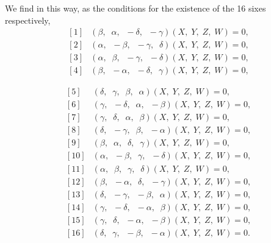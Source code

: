 \documentclass[11pt,a4paper]{article}
\begin{document}
\medskip

We find in this way, as the conditions for the existence of the 16 sixes respectively,
\[
\begin{array}{rl}
{[1]} & (\beta,\;\;\alpha,\;\;-\delta,\;\;-\gamma)(X,\;Y,\;Z,\;W) = 0,\\
{[2]} & (\alpha,\;\;-\beta,\;\;-\gamma,\;\;\delta)(X,\;Y,\;Z,\;W) = 0,\\
{[3]} & (\alpha,\;\;\beta,\;\;-\gamma,\;\;-\delta)(X,\;Y,\;Z,\;W) = 0,\\
{[4]} & (\beta,\;\;-\alpha,\;\;-\delta,\;\;\gamma)(X,\;Y,\;Z,\;W) = 0,
\end{array}
\]

\newpage


\[
\begin{array}{rl}
{[5]} & (\delta,\;\;\gamma,\;\;\beta,\;\;\alpha)(X,\;Y,\;Z,\;W) = 0,\\
{[6]} & (\gamma,\;\;-\delta,\;\;\alpha,\;\;-\beta)(X,\;Y,\;Z,\;W) = 0,\\
{[7]} & (\gamma,\;\;\delta,\;\;\alpha,\;\;\beta)(X,\;Y,\;Z,\;W) = 0,\\
{[8]} & (\delta,\;\;-\gamma,\;\;\beta,\;\;-\alpha)(X,\;Y,\;Z,\;W) = 0,\\
{[9]} & (\beta,\;\;\alpha,\;\;\delta,\;\;\gamma)(X,\;Y,\;Z,\;W) = 0,\\
{[10]} & (\alpha,\;\;-\beta,\;\;\gamma,\;\;-\delta)(X,\;Y,\;Z,\;W) = 0,\\
{[11]} & (\alpha,\;\;\beta,\;\;\gamma,\;\;\delta)(X,\;Y,\;Z,\;W) = 0,\\
{[12]} & (\beta,\;\;-\alpha,\;\;\delta,\;\;-\gamma)(X,\;Y,\;Z,\;W) = 0,\\
{[13]} & (\delta,\;\;-\gamma,\;\;-\beta,\;\;\alpha)(X,\;Y,\;Z,\;W) = 0,\\
{[14]} & (\gamma,\;\;-\delta,\;\;-\alpha,\;\;\beta)(X,\;Y,\;Z,\;W) = 0,\\
{[15]} & (\gamma,\;\;\delta,\;\;-\alpha,\;\;-\beta)(X,\;Y,\;Z,\;W) = 0,\\
{[16]} & (\delta,\;\;\gamma,\;\;-\beta,\;\;-\alpha)(X,\;Y,\;Z,\;W) = 0.
\end{array}
\]
\end{document}
